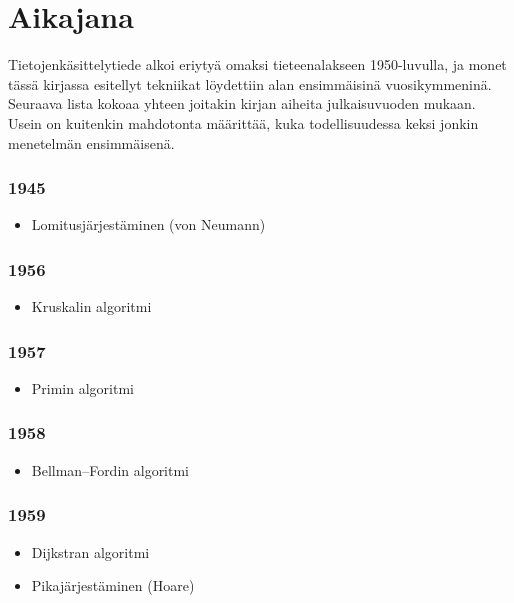 \chapter{Aikajana}

Tietojenkäsittelytiede alkoi eriytyä omaksi tieteenalakseen
1950-luvulla, ja monet tässä kirjassa esitellyt tekniikat
löydettiin alan ensimmäisinä vuosikymmeninä.
Seuraava lista kokoaa yhteen joitakin kirjan aiheita
julkaisuvuoden mukaan.
Usein on kuitenkin mahdotonta määrittää,
kuka todellisuudessa keksi jonkin menetelmän ensimmäisenä.

\subsection*{1945}

\begin{itemize}
\item
Lomitusjärjestäminen (von Neumann)
\end{itemize}

\subsection*{1956}

\begin{itemize}
\item
Kruskalin algoritmi
\end{itemize}

\subsection*{1957}

\begin{itemize}
\item
Primin algoritmi
\end{itemize}

\subsection*{1958}

\begin{itemize}
\item
Bellman–Fordin algoritmi
\end{itemize}

\subsection*{1959}

\begin{itemize}
\item
Dijkstran algoritmi
\item
Pikajärjestäminen (Hoare)
\end{itemize}

